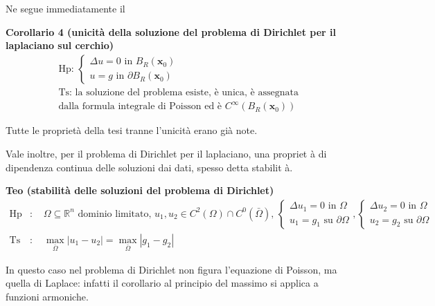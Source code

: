 \documentclass{article}
\begin{document}
Ne segue immediatamente il

\textbf{Corollario 4 (unicit\`{a} della soluzione del problema di Dirichlet
per il laplaciano sul cerchio)}%
\begin{gather*}
\text{Hp: }\left\{ 
\begin{array}{c}
\Delta u=0\text{ in }B_{R}\left( \mathbf{x}_{0}\right) \\ 
u=g\text{ in }\partial B_{R}\left( \mathbf{x}_{0}\right)%
\end{array}%
\right. \\
\text{Ts: la soluzione del problema esiste, \`{e} unica, \`{e} assegnata } \\
\text{dalla formula integrale di Poisson ed \`{e} }C^{\infty }\left(
B_{R}\left( \mathbf{x}_{0}\right) \right)
\end{gather*}


Tutte le propriet\`{a} della tesi tranne l'unicit\`{a} erano gi\`{a} note.

Vale inoltre, per il problema di Dirichlet per il laplaciano, una propriet%
\`{a} di dipendenza continua delle soluzioni dai dati, spesso detta stabilit%
\`{a}.

\textbf{Teo (stabilit\`{a} delle soluzioni del problema di Dirichlet)}%
\begin{eqnarray*}
\text{Hp} &\text{: }&\Omega \subseteq 
\mathbb{R}
^{n}\text{ dominio limitato, }u_{1},u_{2}\in C^{2}\left( \Omega \right) \cap
C^{0}\left( \bar{\Omega}\right) \text{, }\left\{ 
\begin{array}{c}
\Delta u_{1}=0\text{ in }\Omega \\ 
u_{1}=g_{1}\text{ su }\partial \Omega%
\end{array}%
\right. ,\left\{ 
\begin{array}{c}
\Delta u_{2}=0\text{ in }\Omega \\ 
u_{2}=g_{2}\text{ su }\partial \Omega%
\end{array}%
\right. \\
\text{Ts} &\text{: }&\max_{\bar{\Omega}}\left\vert u_{1}-u_{2}\right\vert
=\max_{\bar{\Omega}}\left\vert g_{1}-g_{2}\right\vert
\end{eqnarray*}

In questo caso nel problema di Dirichlet non figura l'equazione di Poisson,
ma quella di Laplace: infatti il corollario al principio del massimo si
applica a funzioni armoniche.
\end{document}
